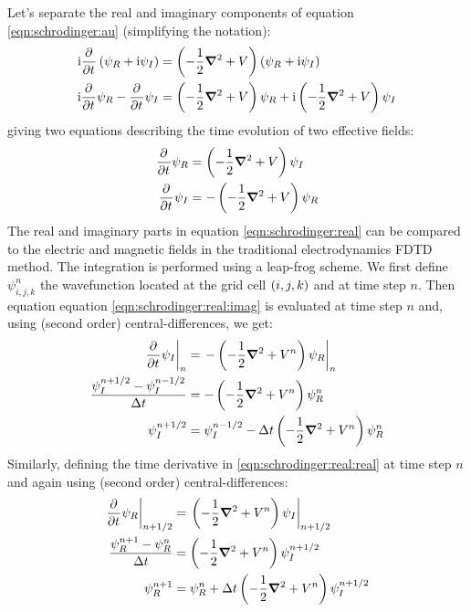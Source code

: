 Let's separate the real and imaginary components of equation
\eqref{eqn:schrodinger:au} (simplifying the notation):
\begin{align}
\textrm{i} \frac{\partial^{{}}   }{\partial t^{{}}} \left(  \psi_R + \textrm{i} \psi_I \right)
    & = \left( -\frac{1}{2} \bm{\nabla}^2 + V  \right)
        \left(  \psi_R + \textrm{i} \psi_I \right) \\
\textrm{i} \frac{\partial^{{}}   }{\partial t^{{}}} \psi_R - \frac{\partial^{{}}   }{\partial t^{{}}} \psi_I
    & = \left( -\frac{1}{2} \bm{\nabla}^2 + V  \right) \psi_R
      + \textrm{i} \left( -\frac{1}{2} \bm{\nabla}^2 + V  \right) \psi_I
\end{align}
giving two equations describing the time evolution of two effective fields:
\begin{subequations}
\begin{align}
\frac{\partial^{{}}   }{\partial t^{{}}} \psi_R & =   \left( -\frac{1}{2} \bm{\nabla}^2 + V  \right) \psi_I
\label{eqn:schrodinger:real:real} \\
\frac{\partial^{{}}   }{\partial t^{{}}} \psi_I & = - \left( -\frac{1}{2} \bm{\nabla}^2 + V  \right) \psi_R
\label{eqn:schrodinger:real:imag}
\end{align}
\label{eqn:schrodinger:real}
\end{subequations}
The real and imaginary parts in equation \eqref{eqn:schrodinger:real} can be
compared to the electric and magnetic fields in the traditional electrodynamics
FDTD method. The integration is performed using a leap-frog scheme. We
first define $\psi_{i,j,k}^{n}$ the wavefunction located at the grid cell
$\left( i,j,k \right)$ and at time step $n$. Then equation equation
\eqref{eqn:schrodinger:real:imag} is evaluated at time step $n$ and, using
(second order) central-differences, we get:
\begin{align}
\left. \frac{\partial^{{}}   }{\partial t^{{}}} \psi_I \right|_{n}
& = \left. - \left( -\frac{1}{2} \bm{\nabla}^2 + V^{n}  \right) \psi_R \right|_{n} \\
\frac{\psi_{I}^{n+1/2} - \psi_{I}^{n-1/2}}{\Delta t}
& = - \left( -\frac{1}{2} \bm{\nabla}^2 + V^{n}  \right) \psi_{R}^{n} \\
\psi_{I}^{n+1/2}
& = \psi_{I}^{n-1/2} - \Delta t \left( -\frac{1}{2} \bm{\nabla}^2 + V^{n}  \right)
\psi_{R}^{n}
\label{eqn:schrodinger:real:imag:discretized}
\end{align}
Similarly, defining the time derivative in \eqref{eqn:schrodinger:real:real} at
time step $n$ and again using (second order) central-differences:
\begin{align}
\left. \frac{\partial^{{}}   }{\partial t^{{}}} \psi_R \right|_{n+1/2}
& = \left. \left( -\frac{1}{2} \bm{\nabla}^2 + V^{n}  \right) \psi_I \right|_{n+1/2} \\
\frac{\psi_{R}^{n+1} - \psi_{R}^{n}}{\Delta t}
& = \left( -\frac{1}{2} \bm{\nabla}^2 + V^{n}  \right) \psi_{I}^{n+1/2} \\
\psi_{R}^{n+1}
& = \psi_{R}^{n} + \Delta t \left( -\frac{1}{2} \bm{\nabla}^2 + V^{n}  \right)
\psi_{I}^{n+1/2}
\label{eqn:schrodinger:real:real:discretized}
\end{align}

